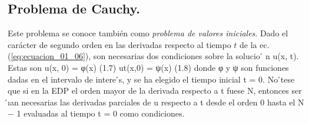 \subsection{Problema de Cauchy.}
Este problema se conoce también como \emph{problema de valores iniciales}. Dado el carácter de segundo orden en las derivadas respecto al tiempo $t$ de la ec. (\ref{eq:ecuacion_01_06}), son necesarias dos condiciones sobre la solucio ́ n u(x, t). Estas son
u(x, 0) = φ(x) (1.7) ut(x,0) = ψ(x) (1.8)
donde φ y ψ son funciones dadas en el intervalo de intere ́s, y se ha elegido el tiempo inicial t = 0.
No ́tese que si en la EDP el orden mayor de la derivada respecto a t fuese N, entonces ser ́ıan necesarias las derivadas parciales de u respecto a t desde el orden 0 hasta el N − 1 evaluadas al tiempo t = 0 como condiciones.

